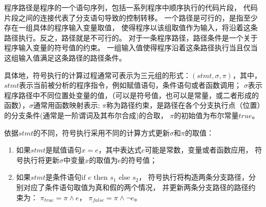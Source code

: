 程序路径是程序的一个语句序列，包括一系列程序中顺序执行的代码片段，
代码片段之间的连接代表了分支语句导致的控制转移。
一个路径是可行的，是指至少存在一组具体的程序输入变量取值，
使得程序以该组取值作为输入，将沿着这条路径执行。反之，路径就是不可行的。
对于一条程序路径，路径条件是一个关于程序输入变量的符号值的约束。
一组输入值使得程序沿着这条路径执行当且仅当这组输入值满足这条路径的路径条件。

具体地，符号执行的计算过程通常可表示为三元组的形式：$(stmt, \sigma, \pi)$，其中，
$stmt$表示当前被分析的程序指令，例如赋值语句，条件语句或者函数调用；
$\sigma$表示程序路径中不同位置处变量的值，（可以是符号值，也可以是常量，或二者形成的函数），$\sigma$通常用函数映射表示;
$\pi$称为路径约束，是路径在各个分支执行点（位置）的分支条件(通常是一阶谓词及其布尔合成)的合取，
$\pi$的初始值为布尔常量$true$。

依据$stmt$的不同，符号执行采用不同的计算方式更新$\sigma$和$\pi$的取值：
\begin{enumerate}
\item 如果$stmt$是赋值语句$x = e$，其中表达式$e$可能是常数，变量或者函数应用，
	符号执行将更新$\sigma$中变量$x$的取值为$e$的符号值；
\item 如果$stmt$是条件语句$\text{if } e \text{ then } s_1 \text{ else } s_2$，
	符号执行将构造两条分支路径，分别对应了条件语句取值为真和假的两个情况，
	并更新两条分支路径的路径约束为： $\pi_{true} = \pi \wedge e$， 
	$\pi_{false} = \pi \wedge  \neg e$。
\end{enumerate}


